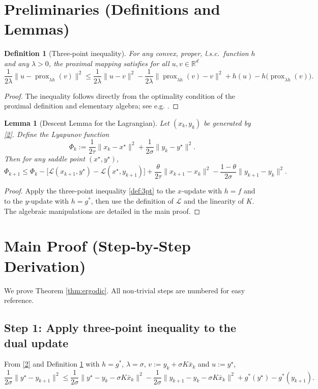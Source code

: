 \documentclass[11pt]{article}
\newtheorem{lemma}{Lemma}
\newtheorem{definition}{Definition}
\newcommand{\prox}{\operatorname{prox}}
\newcommand{\norm}[1]{\|#1\|}
\begin{document}
\newpage
\section*{Preliminaries (Definitions and Lemmas)}
\begin{definition}[Three‑point inequality]\label{def:3pt}
For any convex, proper, l.s.c.\ function $h$ and any $\lambda>0$, the proximal mapping satisfies for all $u,v\in\mathbb{R}^{d}$
\[
\frac{1}{2\lambda}\norm{u-\prox_{\lambda h}(v)}^{2}
\le
\frac{1}{2\lambda}\norm{u-v}^{2}
- \frac{1}{2\lambda}\norm{\prox_{\lambda h}(v)-v}^{2}
+ h(u)-h\bigl(\prox_{\lambda h}(v)\bigr).
\tag{7}
\]
\end{definition}
\begin{proof}
The inequality follows directly from the optimality condition of the proximal definition and elementary algebra; see e.g. \cite{Combettes2011}.
\end{proof}

\begin{lemma}[Descent Lemma for the Lagrangian]\label{lem:descent}
Let $(x_{k},y_{k})$ be generated by \eqref{2}. Define the Lyapunov function
\[
\Phi_{k}:=
\frac{1}{2\tau}\norm{x_{k}-x^{\star}}^{2}
+\frac{1}{2\sigma}\norm{y_{k}-y^{\star}}^{2}.
\tag{8}
\]
Then for any saddle point $(x^{\star},y^{\star})$,
\[
\Phi_{k+1}
\le
\Phi_{k}
- \bigl[\mathcal{L}(x_{k+1},y^{\star})-\mathcal{L}(x^{\star},y_{k+1})\bigr]
+ \frac{\theta}{2\tau}\norm{x_{k+1}-x_{k}}^{2}
- \frac{1-\theta}{2\sigma}\norm{y_{k+1}-y_{k}}^{2}.
\tag{9}
\]
\end{lemma}
\begin{proof}
Apply the three‑point inequality \eqref{def:3pt} to the $x$‑update with $h=f$ and to the $y$‑update with $h=g^{*}$, then use the definition of $\mathcal{L}$ and the linearity of $K$. The algebraic manipulations are detailed in the main proof.
\end{proof}

\section*{Main Proof (Step‑by‑Step Derivation)}
We prove Theorem \ref{thm:ergodic}. All non‑trivial steps are numbered for easy reference.

\subsection*{Step 1: Apply three‑point inequality to the dual update}
From \eqref{2} and Definition \ref{def:3pt} with $h=g^{*}$, $\lambda=\sigma$, $v:=y_{k}+\sigma K\bar{x}_{k}$ and $u:=y^{\star}$,
\[
\frac{1}{2\sigma}\norm{y^{\star}-y_{k+1}}^{2}
\le
\frac{1}{2\sigma}\norm{y^{\star}-y_{k}-\sigma K\bar{x}_{k}}^{2}
- \frac{1}{2\sigma}\norm{y_{k+1}-y_{k}-\sigma K\bar{x}_{k}}^{2}
+ g^{*}(y^{\star})-g^{*}(y_{k+1}).
\tag{Step 1}
\]
\end{document}
